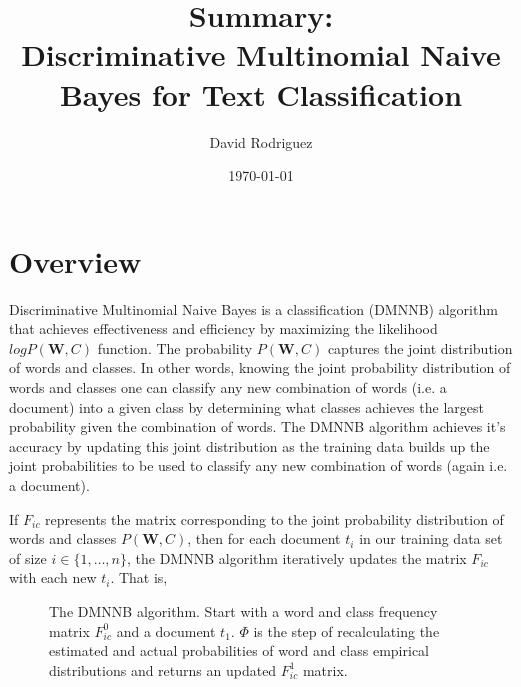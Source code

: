 \documentclass{article}
\begin{document}
\title{Summary: \\ \Large{Discriminative Multinomial Naive Bayes for Text Classification}}
\author{David Rodriguez}
\date{\today}
\maketitle

\section{Overview}

Discriminative Multinomial Naive Bayes is a classification (DMNNB) algorithm that achieves effectiveness and efficiency by maximizing the likelihood $logP(\textbf{W},C)$ function. The probability $P(\textbf{W},C)$ captures the joint distribution of words and classes. In other words, knowing the joint probability distribution of words and classes one can classify any new combination of words (i.e. a document) into a given class by determining what classes achieves the largest probability given the combination of words. The DMNNB algorithm achieves it's accuracy by updating this joint distribution as the training data builds up the joint probabilities to be used to classify any new combination of words (again i.e. a document).

If $F_{ic}$ represents the matrix corresponding to the joint probability distribution of words and classes $P(\textbf{W},C)$, then for each document $t_i$ in our training data set of size $i \in \{1,\dots,n\}$, the DMNNB algorithm iteratively updates the matrix $F_{ic}$ with each new $t_i$. That is,

\begin{figure}[H]
\begin{center}
\end{center}
\caption{The DMNNB algorithm. Start with a word and class frequency matrix $F^0_{ic}$ and a document $t_1$. $\Phi$ is the step of recalculating the estimated and actual probabilities of word and class empirical distributions and returns an updated $F^1_{ic}$ matrix.}
\end{figure}
\end{document}

